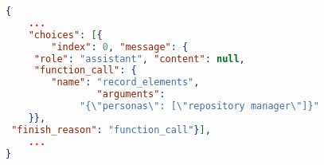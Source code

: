 \begin{lstlisting}[language=json,firstnumber=1]
{
    ...
    "choices": [{
    	"index": 0, "message": {
	 "role": "assistant", "content": null,
	 "function_call": {
	    "name": "record_elements",
          	    "arguments":
	         "{\"personas\": [\"repository manager\"]}"
    }},
 "finish_reason": "function_call"}],
    ...
}
\end{lstlisting}